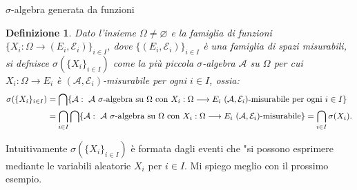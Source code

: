 \documentclass[11pt]{book}
\theoremstyle{Definizione}
\newtheorem*{mydef}{Definizione}
\theoremstyle{TeoremaProposizioneLemmaCorollario}
\theoremstyle{OsservazioneNota}
\begin{document}
\begin{boxdef}{$\sigma$-algebra generata da funzioni}
\begin{mydef}
Dato l'insieme $\Omega \neq \varnothing$ e la famiglia di funzioni $\{X_i:\Omega \longrightarrow (E_i,\mathcal{E}_i)\}_{i\in I}$, dove $\{(E_i,\mathcal{E}_i)\}_{i\in I}$ è una famiglia di spazi misurabili, si defnisce $\sigma(\{X_i\}_{i\in I})$ come la più piccola $\sigma$-algebra $\mathcal{A}$ su $\Omega$ per cui $X_i:\Omega\longrightarrow E_i$ è $(\mathcal{A},\mathcal{E}_i)$-misurabile per ogni $i\in I$, ossia:
\begin{align*}
\sigma(\{X_i\}_{i\in I}) &= \bigcap \{\mathcal{A}:\ \mathcal{A}\ \sigma\textup{-algebra su }\Omega\textup{ con }X_i:\Omega \longrightarrow E_i\ (\mathcal{A},\mathcal{E}_i)\textup{-misurabile per ogni }i\in I\}\\
&= \bigcap_{i\in I} \bigcap\{\mathcal{A}:\ \mathcal{A}\ \sigma\textup{-algebra su }\Omega\textup{ con }X_i:\Omega \longrightarrow E_i\ (\mathcal{A},\mathcal{E}_i)\textup{-misurabile}\} = \bigcap_{i\in I} \sigma(X_i).
\end{align*}
\end{mydef}
\end{boxdef}
Intuitivamente $\sigma(\{X_i\}_{i\in I})$ è formata dagli eventi che "si possono esprimere mediante le variabili aleatorie $X_i$ per $i\in I$. Mi spiego meglio con il prossimo esempio.
\end{document}
